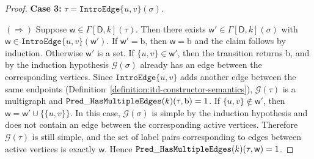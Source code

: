 \documentclass[11pt,a4paper]{article}
\newcommand{\truevalue}{1}
\newcommand{\treewidthvalue}{k}
\newcommand{\decompositiongraph}[1]{\mathcal{G}(#1)}
\newcommand{\introedgetype}[2]{\mathtt{IntroEdge}\{#1,#2\}}
\newcommand{\introedgegeneric}[2]{\mathtt{IntroEdge}\{#1,#2\}}
\newcommand{\abstractdecomposition}{\tau}
\newcommand{\sigmaabstractdecomposition}{\sigma}
\newcommand{\vertexone}{u}
\newcommand{\vertextwo}{v}
\newcommand{\awitness}{\mathsf{w}}
\newcommand{\dpcore}{\mathsf{D}}
\newcommand{\dpNamePart}[1]{\mbox{\normalfont\ttfamily #1}}
\newcommand{\predicateHasMultiEdge}[1]{\dpNamePart{Pred}\_\allowbreak\dpNamePart{HasMultipleEdges}(#1)}
\newcommand{\dynamizationfunctionname}[1]{\Gamma[{#1}]}
\newcommand{\dynamizationfunction}[2]{\dynamizationfunctionname{#1,#2}}
\newcommand{\multiedgefound}{\mathrm{b}}
\begin{document}
{\begin{proof}
		\medskip
		\noindent\textbf{Case 3:} \(\abstractdecomposition=\introedgetype{\vertexone}{\vertextwo}(\sigmaabstractdecomposition)\).

			$(\Rightarrow)$ Suppose \(\awitness\in \dynamizationfunction{\dpcore}{\treewidthvalue}(\abstractdecomposition)\). Then there exists \(\awitness'\in \dynamizationfunction{\dpcore}{\treewidthvalue}(\sigmaabstractdecomposition)\) with \(\awitness\in \introedgegeneric{\vertexone}{\vertextwo}(\awitness')\). If \(\awitness'=\multiedgefound\), then \(\awitness=\multiedgefound\) and the claim follows by induction. Otherwise \(\awitness'\) is a set. If \(\{\vertexone,\vertextwo\}\in \awitness'\), then the transition returns \(\multiedgefound\), and by the induction hypothesis \(\decompositiongraph{\sigmaabstractdecomposition}\) already has an edge between the corresponding vertices. Since \(\introedgetype{\vertexone}{\vertextwo}\) adds another edge between the same endpoints (Definition~\ref{definition:itd-constructor-semantics}), \(\decompositiongraph{\abstractdecomposition}\) is a multigraph and \(\predicateHasMultiEdge{\treewidthvalue}(\abstractdecomposition,\multiedgefound)=\truevalue\). If \(\{\vertexone,\vertextwo\}\notin \awitness'\), then \(\awitness=\awitness'\cup\{\{\vertexone,\vertextwo\}\}\). In this case, \(\decompositiongraph{\sigmaabstractdecomposition}\) is simple by the induction hypothesis and does not contain an edge between the corresponding active vertices. Therefore \(\decompositiongraph{\abstractdecomposition}\) is still simple, and the set of label pairs corresponding to edges between active vertices is exactly \(\awitness\). Hence \(\predicateHasMultiEdge{\treewidthvalue}(\abstractdecomposition,\awitness)=\truevalue\).


\end{proof}}
\end{document}
